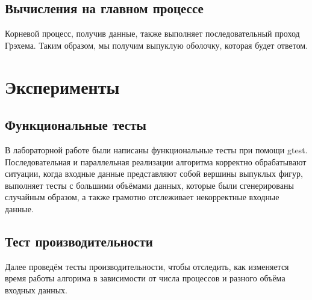 \documentclass[a4paper,12pt]{article}
\begin{document}
\subsection*{Вычисления на главном процессе}
\hspace*{15pt}Корневой процесс, получив данные, также выполняет последовательный проход Грэхема. Таким образом, мы получим выпуклую оболочку, которая будет ответом.

\section{Эксперименты}

\subsection*{Функциональные тесты}
\hspace*{15pt}В лабораторной работе были написаны функциональные тесты при помощи gtest. Последовательная и параллельная реализации алгоритма корректно обрабатывают ситуации, когда входные данные представляют собой вершины выпуклых фигур, выполняет тесты с большими объёмами данных, которые были сгенерированы случайным образом, а также грамотно отслеживает некорректные входные данные.

\subsection*{Тест производительности}

\hspace*{15pt}Далее проведём тесты производительности, чтобы отследить, как изменяется время работы алгорима в зависимости от числа процессов и разного объёма входных данных.
\end{document}
